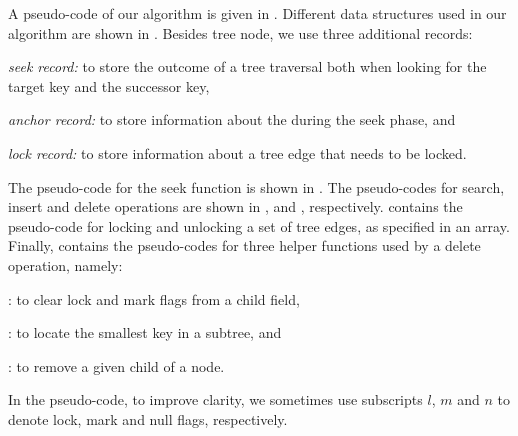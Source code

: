 \begin{limitscope}


A pseudo-code of our algorithm is given in .
Different data structures used in our algorithm are shown in . Besides tree node, we use three additional records:
\begin{enumerate*}[label=(\alph*)]
\item  \emph{seek record:} to store the outcome of a tree traversal both when looking for the target key and the successor key, 
\item \emph{anchor record:} to store information about the \anchornode{} during the seek phase, and
\item  \emph{lock record:} to store information about a tree edge that needs to be locked. 
\end{enumerate*}

The pseudo-code for the seek function is shown in . The 
pseudo-codes for search, insert and delete operations are shown  in 
,  and , respectively. 
 contains the pseudo-code for locking and unlocking a 
set of tree edges, as specified in an array. Finally,  contains the pseudo-codes for 
three helper functions used by a delete operation, namely:
\begin{enumerate*}[label=(\alph*)]
\item \ClearFlags{}: to clear lock and mark flags from a child field, 
\item \FindSmallest{}: to locate the smallest key in a subtree, and
\item \RemoveChild{}: to remove a given child of a node.
\end{enumerate*}

In the pseudo-code, to improve clarity, we sometimes use subscripts $l$, $m$ and $n$ to denote lock, mark and null flags, respectively.  


\end{limitscope}